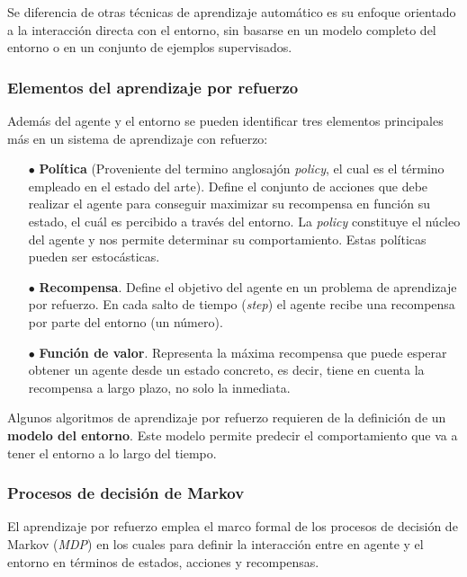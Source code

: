 Se diferencia de otras técnicas de aprendizaje automático es su enfoque orientado a la interacción directa con el entorno, sin basarse en un modelo completo del entorno o en un conjunto de ejemplos supervisados.

\subsubsection{Elementos del aprendizaje por refuerzo}
Además del agente y el entorno se pueden identificar tres elementos principales más en un sistema de aprendizaje con refuerzo:

\begin{itemize}
	\item[$\bullet$] \textbf{Política} (Proveniente del termino anglosajón \textit{policy}, el cual es el término empleado en el estado del arte). Define el conjunto de acciones que debe realizar el agente para conseguir maximizar su recompensa en función su estado, el cuál es percibido a través del entorno. La \textit{policy} constituye el núcleo del agente y nos permite determinar su comportamiento. Estas políticas pueden ser estocásticas.
	
	\item[$\bullet$] \textbf{Recompensa}. 
	Define el objetivo del agente en un problema de aprendizaje por refuerzo. En cada salto de tiempo (\textit{step}) el agente recibe una recompensa por parte del entorno (un número). 
	
	\item[$\bullet$] \textbf{Función de valor}. Representa la máxima recompensa que puede esperar obtener un agente desde un estado concreto, es decir, tiene en cuenta la recompensa a largo plazo, no solo la inmediata. 
		
\end{itemize}
Algunos algoritmos de aprendizaje por refuerzo requieren de la definición de un \textbf{modelo del entorno}. Este modelo permite predecir el comportamiento que va a tener el entorno a lo largo del tiempo.

\subsubsection{Procesos de decisión de Markov}

El aprendizaje por refuerzo emplea el marco formal de los procesos de decisión de Markov (\textit{MDP}) en los cuales para definir la interacción entre en agente y el entorno en términos de estados, acciones y recompensas.

